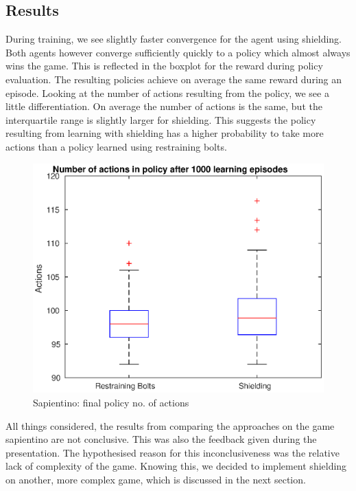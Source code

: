 \documentclass[letterpaper]{article}
\begin{document}
\subsection{Results}
During training, we see slightly faster convergence for the agent using shielding. Both agents however converge sufficiently quickly to a policy which almost always wins the game. This is reflected in the boxplot for the reward during policy evaluation. The resulting policies achieve on average the same reward during an episode. Looking at the number of actions resulting from the policy, we see a little differentiation. On average the number of actions is the same, but the interquartile range is slightly larger for shielding. This suggests the policy resulting from learning with shielding has a higher probability to take more actions than a policy learned using restraining bolts.
\begin{figure}
    \centering
    \includegraphics[width=.5\textwidth]{figs/policy_actions.eps}
    \caption{Sapientino: final policy no. of actions}
    \label{fig:sapientino_policy_actions}
\end{figure}
\par All things considered, the results from comparing the approaches on the game sapientino are not conclusive. This was also the feedback given during the presentation. The hypothesised reason for this inconclusiveness was the relative lack of complexity of the game. Knowing this, we decided to implement shielding on another, more complex game, which is discussed in the next section.
\end{document}
